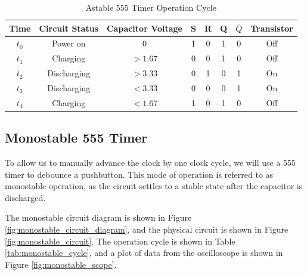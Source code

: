 \documentclass[12pt]{article}
\begin{document}
\begin{FlushLeft}
\begin{table}[h]
  \begin{center}
    \begin{tabular}{ c | c c c c c c c }
      Time & Circuit Status & Capacitor Voltage & S & R & Q & $\overline Q$ & Transistor \\
      \hline
      $t_0$ & Power on    & 0       & 1 & 0 & 1 & 0 & Off \\
      $t_1$ & Charging    & $>1.67$ & 0 & 0 & 1 & 0 & Off \\
      $t_2$ & Discharging & $>3.33$ & 0 & 1 & 0 & 1 & On  \\
      $t_3$ & Discharging & $<3.33$ & 0 & 0 & 0 & 1 & On  \\
      $t_4$ & Charging    & $<1.67$ & 1 & 0 & 1 & 0 & Off \\
    \end{tabular}
    \caption{Astable 555 Timer Operation Cycle}
    \label{tab:astable_cycle}
  \end{center}
\end{table}

\clearpage


\subsection{Monostable 555 Timer}
To allow us to manually advance the clock by one clock cycle, we will use a 555 timer to debounce a pushbutton. This mode of operation is referred to as monostable operation, as the circuit settles to a stable state after the capacitor is discharged.

\vspace{0.3cm}

The monostable circuit diagram is shown in Figure \ref{fig:monostable_circuit_diagram}, and the physical circuit is shown in Figure \ref{fig:monostable_circuit}. The operation cycle is shown in Table \ref{tab:monostable_cycle}, and a plot of data from the oscilloscope is shown in Figure \ref{fig:monostable_scope}.


\end{FlushLeft}
\end{document}
